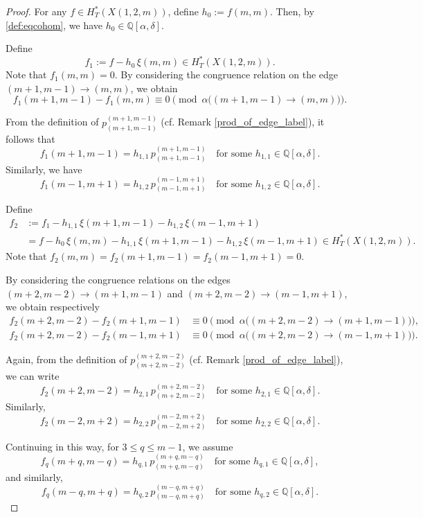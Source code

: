 \documentclass[10pt, a4paper, reqno]{amsart}
\begin{document}
	\begin{proof}
		For any \( f \in H_T^*(X(1,2,m)) \), define \( h_0 := f(m,m) \). 
		Then, by \eqref{def:eqcohom}, we have \( h_0 \in \mathbb{Q}[\alpha, \delta] \).
		
		Define  
		\[
		f_{1} := f - h_0 \, \xi(m,m) \in H_T^*(X(1,2,m)).
		\]
		Note that \( f_{1}(m,m) = 0 \).  
		By considering the congruence relation on the edge \((m+1,m-1) \to (m,m)\), we obtain  
		\[
		f_{1}(m+1,m-1) - f_{1}(m,m) \equiv 0 
		\pmod{\alpha\big((m+1,m-1)\to (m,m)\big)}.
		\]
		
		From the definition of \( p^{(m+1,m-1)}_{(m+1,m-1)} \) (cf. Remark \ref{prod_of_edge_label}), it follows that  
		\[
		f_{1}(m+1,m-1) = h_{1,1} \, p^{(m+1,m-1)}_{(m+1,m-1)} 
		\quad \text{for some } h_{1,1} \in \mathbb{Q}[\alpha,\delta].
		\]
		Similarly, we have  
		\[
		f_{1}(m-1,m+1) = h_{1,2} \, p^{(m-1,m+1)}_{(m-1,m+1)} 
		\quad \text{for some } h_{1,2} \in \mathbb{Q}[\alpha,\delta].
		\]
		
		Define  
		\[
		\begin{split}
			f_{2} 
			&:= f_1 - h_{1,1} \, \xi(m+1,m-1) - h_{1,2} \, \xi(m-1,m+1) \\
			&= f - h_0 \, \xi(m,m) - h_{1,1} \, \xi(m+1,m-1) - h_{1,2} \, \xi(m-1,m+1)
			\in H_T^*(X(1,2,m)).
		\end{split}
		\]
		Note that \( f_{2}(m,m) = f_{2}(m+1,m-1) = f_{2}(m-1,m+1) = 0 \).
		
		By considering the congruence relations on the edges 
		\((m+2,m-2) \to (m+1,m-1)\) and \((m+2,m-2) \to (m-1,m+1)\), 
		we obtain respectively  
		\begin{align*}
			f_{2}(m+2,m-2) - f_{2}(m+1,m-1)
			&\equiv 0 \pmod{\alpha\big((m+2,m-2)\to (m+1,m-1)\big)}, \\
			f_{2}(m+2,m-2) - f_{2}(m-1,m+1)
			&\equiv 0 \pmod{\alpha\big((m+2,m-2)\to (m-1,m+1)\big)}.
		\end{align*}
		
		Again, from the definition of \( p^{(m+2,m-2)}_{(m+2,m-2)} \) (cf. Remark \ref{prod_of_edge_label}), 
		we can write  
		\[
		f_{2}(m+2,m-2) = h_{2,1} \, p^{(m+2,m-2)}_{(m+2,m-2)} 
		\quad \text{for some } h_{2,1} \in \mathbb{Q}[\alpha,\delta].
		\]
		Similarly,  
		\[
		f_{2}(m-2,m+2) = h_{2,2} \, p^{(m-2,m+2)}_{(m-2,m+2)} 
		\quad \text{for some } h_{2,2} \in \mathbb{Q}[\alpha,\delta].
		\]
		
		Continuing in this way, for \( 3 \leq q \leq m-1 \), we assume  
		\[
		f_{q}(m+q,m-q) = h_{q,1} \, p^{(m+q,m-q)}_{(m+q,m-q)} 
		\quad \text{for some } h_{q,1} \in \mathbb{Q}[\alpha,\delta],
		\]
		and similarly,  
		\[
		f_{q}(m-q,m+q) = h_{q,2} \, p^{(m-q,m+q)}_{(m-q,m+q)} 
		\quad \text{for some } h_{q,2} \in \mathbb{Q}[\alpha,\delta].
		\]
		

\end{proof}
\end{document}
